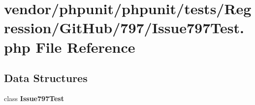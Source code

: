 \section{vendor/phpunit/phpunit/tests/\+Regression/\+Git\+Hub/797/\+Issue797\+Test.php File Reference}
\label{_issue797_test_8php}
\subsection*{Data Structures}
\begin{DoxyCompactItemize}
\item 
class {\bf Issue797\+Test}
\end{DoxyCompactItemize}
